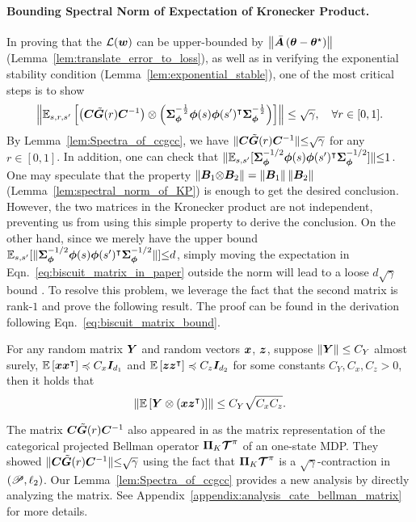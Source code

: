 \paragraph{Bounding Spectral Norm of Expectation of Kronecker Product.}
In proving that the ${\mathcal{L}}({\bm{w}})$ can be upper-bounded by $\left\|{\bar{{\bm{A}}}\left({{{\bm{\theta}}}-{\bm{\theta}}^{\star}}\right)}\right\|$ (Lemma~\ref{lem:translate_error_to_loss}), as well as in verifying the exponential stability condition (Lemma~\ref{lem:exponential_stable}), one of the most critical steps is to show
\begin{equation}\label{eq:biscuit_matrix_in_paper}
    \left\|{ {\mathbb E}_{s, r, s^\prime}\left[{\left({{\bm{C}}\tilde{{\bm{G}}}(r){\bm{C}}^{-1}}\right)\otimes\left({{\bm{\Sigma}}_{{\bm{\phi}}}^{-\frac{1}{2}}{\bm{\phi}}(s){\bm{\phi}}(s^\prime)^{\intercal}{\bm{\Sigma}}_{{\bm{\phi}}}^{-\frac{1}{2}}}\right)}\right] }\right\| \leq \sqrt{\gamma},\quad\forall r\in[0,1].
\end{equation}
By Lemma~\ref{lem:Spectra_of_ccgcc}, we have $\|{\bm{C}}\tilde{{\bm{G}}}(r){\bm{C}}^{{-}1}\|{\leq} \sqrt{\gamma}$ for any $r\in[0,1]$.
In addition, one can check that $ \|{\mathbb E}_{s,s^\prime}[{\bm{\Sigma}}_{{\bm{\phi}}}^{-1{/}2}{\bm{\phi}}(s){\bm{\phi}}(s^\prime)^{\intercal}{\bm{\Sigma}}_{{\bm{\phi}}}^{-1{/}2}]\|{\leq} 1$.
One may speculate that the property $\left\|{{\bm{B}}_1 {\otimes} {\bm{B}}_2}\right\| = \left\|{{\bm{B}}_1}\right\|\left\|{{\bm{B}}_2}\right\|$ (Lemma~\ref{lem:spectral_norm_of_KP}) is enough to get the desired conclusion.
However, the two matrices in the Kronecker product are not independent, preventing us from using this simple property to derive the conclusion. 
On the other hand, since we merely have the upper bound $ {\mathbb E}_{s,s^\prime}[\|{\bm{\Sigma}}_{{\bm{\phi}}}^{-1{/}2}{\bm{\phi}}(s){\bm{\phi}}(s^\prime)^{\intercal}{\bm{\Sigma}}_{{\bm{\phi}}}^{-1{/}2}\|]{\leq} d$, simply moving the expectation in Eqn.~\eqref{eq:biscuit_matrix_in_paper} outside the norm will lead to a loose $d\sqrt{\gamma}$ bound .
To resolve this problem, we leverage the fact that the second matrix is rank-$1$ and prove the following result. The proof can be found in the derivation following Eqn.~\eqref{eq:biscuit_matrix_bound}.
\begin{lemma}
    For any random matrix ${\bm{Y}}$ and random vectors ${\bm{x}}$, ${\bm{z}}$, suppose $\left\|{{\bm{Y}}}\right\|\leq C_Y$ almost surely, ${\mathbb E}\left[{{\bm{x}}{\bm{x}}^{\intercal}}\right]\preccurlyeq C_x{\bm{I}}_{d_1}$ and ${\mathbb E}\left[{{\bm{z}}{\bm{z}}^{\intercal}}\right]\preccurlyeq C_z{\bm{I}}_{d_2}$ for some constants $C_Y, C_x, C_z>0$, then it holds that
    \begin{equation*}
    \left\|{ {\mathbb E}\left[{{\bm{Y}}\otimes\left({{\bm{x}}{\bm{z}}^{\intercal}}\right) }\right] }\right\| \leq C_Y\sqrt{C_xC_z}.
\end{equation*}
\end{lemma}
\begin{remark}\label{remark:cgc}
The matrix ${\bm{C}}\tilde{{\bm{G}}}(r){\bm{C}}^{-1}$ also appeared in \citep[Proposition~B.2][]{rowland2024nearminimaxoptimal} as the matrix representation of the categorical projected Bellman operator ${\bm{\Pi}}_K\bm{\mathcal{T}}^\pi$ of an one-state MDP. 
They showed $\|{\bm{C}}\tilde{{\bm{G}}}(r){\bm{C}}^{{-}1}\|{\leq} \sqrt{\gamma}$ using the fact that ${\bm{\Pi}}_K\bm{\mathcal{T}}^\pi$ is a $\sqrt{\gamma}$-contraction in $\left({{\mathscr{P}}, \ell_2}\right)$.
Our Lemma~\ref{lem:Spectra_of_ccgcc} provides a new analysis by directly analyzing the matrix.
See Appendix~\ref{appendix:analysis_cate_bellman_matrix} for more details.
\end{remark}
